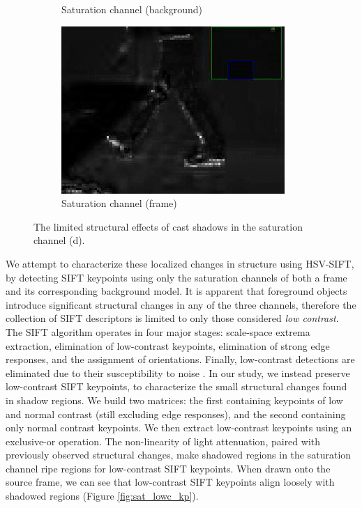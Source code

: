 \begin{figure}
\begin{subfigure}{.49\linewidth}
  \caption{Saturation channel (background)}
\end{subfigure}
\hfill
\begin{subfigure}{.49\linewidth}
  \includegraphics[width=1\linewidth]{figures/lab_sat_fg_zoom_0161.jpg}
  \caption{Saturation channel (frame)}
\end{subfigure}

\caption{The limited structural effects of cast shadows in the saturation channel (d).}
\label{fig:sat_struct}
\end{figure}

We attempt to characterize these localized changes in structure using HSV-SIFT, by detecting SIFT keypoints using only the saturation channels of both a frame and its corresponding background model. It is apparent that foreground objects introduce significant structural changes in any of the three channels,  therefore the collection of SIFT descriptors is limited to only those considered \textit{low contrast}. The SIFT algorithm operates in four major stages: scale-space extrema extraction, elimination of low-contrast keypoints, elimination of strong edge responses, and the assignment of orientations. Finally, low-contrast detections are eliminated due to their susceptibility to noise \cite{lowe1999object}. In our study, we instead preserve low-contrast SIFT keypoints, to characterize the small structural changes found in shadow regions. We build two matrices: the first containing keypoints of low and normal contrast (still excluding edge responses), and the second containing only normal contrast keypoints. We then extract low-contrast keypoints using an exclusive-or operation. The non-linearity of light attenuation, paired with previously observed structural changes, make shadowed regions in the saturation channel ripe regions for low-contrast SIFT keypoints. When drawn onto the source frame, we can see that low-contrast SIFT keypoints align loosely with shadowed regions (Figure \ref{fig:sat_lowc_kp}). 

